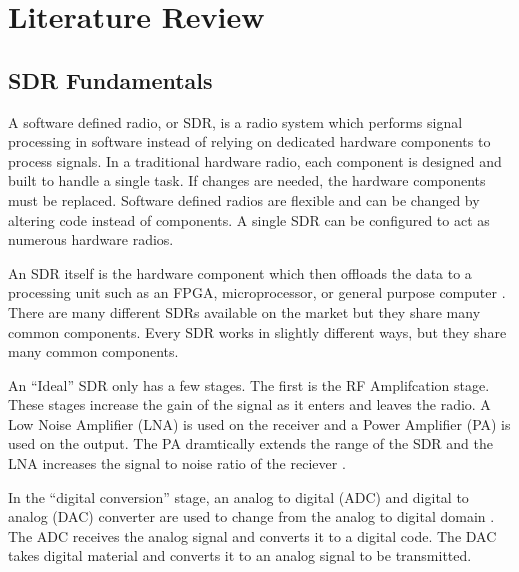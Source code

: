 
\chapter{Literature Review} %

\label{Chapter2} %




\section{SDR Fundamentals}

A software defined radio, or SDR, is a radio system which performs signal processing in software instead of relying on dedicated hardware components to process signals. In a traditional hardware radio, each component is designed and built to handle a single task. If changes are needed, the hardware components must be replaced. Software defined radios are flexible and can be changed by altering code instead of components. A single SDR can be configured to act as numerous hardware radios. \cite{0018} 

An SDR itself is the hardware component which then offloads the data to a processing unit such as an FPGA, microprocessor, or general purpose computer \cite{0018}. There are many different SDRs available on the market but they share many common components. Every SDR works in slightly different ways, but they share many common components. 

An ``Ideal'' SDR only has a few stages. The first is the RF Amplifcation stage. These stages increase the gain of the signal as it enters and leaves the radio. A Low Noise Amplifier (LNA) is used on the receiver and a Power Amplifier (PA) is used on the output. The PA dramtically extends the range of the SDR and the LNA increases the signal to noise ratio of the reciever \cite{0020}. 

In the ``digital conversion'' stage, an analog to digital (ADC) and digital to analog (DAC) converter are used to change from the analog to digital domain \cite{0020}. The ADC receives the analog signal and converts it to a digital code. The DAC takes digital material and converts it to an analog signal to be transmitted. 


